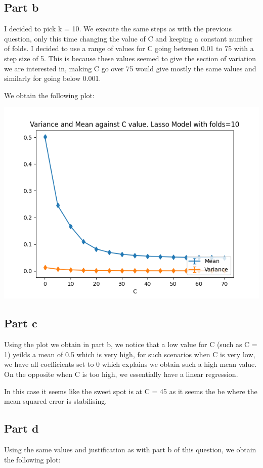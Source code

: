 \documentclass[10pt]{article}
\begin{document}
\subsection*{Part b}
I decided to pick k = 10. We execute the same steps as with the previous question, only this 
time changing the value of C and keeping a constant number of folds.
I decided to use a range of values for C going between 0.01 to 75 with a step size of 5.
This is because these values seemed to give the section of variation we are interested in,
making C go over 75 would give mostly the same values and similarly for going below 0.001.

We obtain the following plot:

\begin{center}
    \includegraphics[scale=0.4]{Figure_10.png}
\end{center}

\subsection*{Part c}
Using the plot we obtain in part b, we notice that a low value for C (such as C = 1)
yeilds a mean of 0.5 which is very high, for such scenarios when C is very low, 
we have all coefficients set to 0 which explains we obtain such a high mean value.
On the opposite when C is too high, we essentially have a linear regression.

In this case it seems like the sweet spot is at C = 45 as it seems the be where the
mean squared error is stabilising.


\subsection*{Part d}
Using the same values and justification as with part b of this question,
we obtain the following plot:
\end{document}
